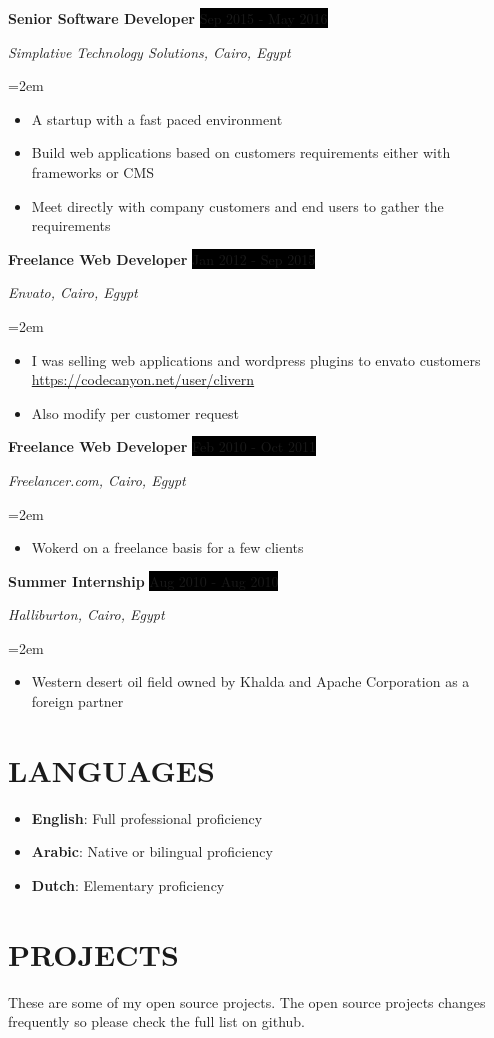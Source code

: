 \documentclass[paper=a4,fontsize=11pt]{scrartcl} %
\newcommand{\sepspace}{\vspace*{1em}}		%
\newcommand{\NewPart}[1]{\section*{\uppercase{#1}}}
\newcommand{\EducationEntry}[4]{
		\noindent \textbf{#1} \hfill      %
		\colorbox{Black}{%
			\parbox{6em}{%
			\hfill\color{White}#2}} \par  %
		\noindent \textit{#3} \par        %
		\noindent\hangindent=2em\hangafter=0 \small #4 %
		\normalsize \par}
\newcommand{\WorkEntry}[4]{				  %
		\noindent \textbf{#1} \hfill      %
		\colorbox{Black}{\color{White}#2} \par  %
		\noindent \textit{#3} \par              %
		\noindent\hangindent=2em\hangafter=0 \small #4 %
		\normalsize \par}
\begin{document}
\WorkEntry{Senior Software Developer}{Sep 2015 - May 2016}{Simplative Technology Solutions, Cairo, Egypt}{\begin{itemize}
\item A startup with a fast paced environment
\item Build web applications based on customers requirements either with frameworks or CMS
\item Meet directly with company customers and end users to gather the requirements
\end{itemize}}
\sepspace

\WorkEntry{Freelance Web Developer}{Jan 2012 - Sep 2015}{Envato, Cairo, Egypt}{\begin{itemize}
\item I was selling web applications and wordpress plugins to envato customers \url{https://codecanyon.net/user/clivern}
\item Also modify per customer request
\end{itemize}}
\sepspace

\WorkEntry{Freelance Web Developer}{Feb 2010 - Oct 2011}{Freelancer.com, Cairo, Egypt}{\begin{itemize}
\item Wokerd on a freelance basis for a few clients
\end{itemize}}
\sepspace

\WorkEntry{Summer Internship}{Aug 2010 - Aug 2010}{Halliburton, Cairo, Egypt}{\begin{itemize}
\item Western desert oil field owned by Khalda and Apache Corporation as a foreign partner
\end{itemize}}


\NewPart{Languages}{}

\begin{itemize}
\item \textbf{English}: Full professional proficiency
\item \textbf{Arabic}: Native or bilingual proficiency
\item \textbf{Dutch}: Elementary proficiency
\end{itemize}


\NewPart{Projects}{}

These are some of my open source projects. The open source projects changes frequently so please check the full list on github.
\end{document}
